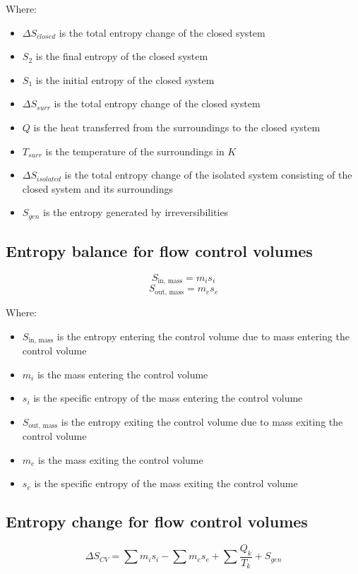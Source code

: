 \documentclass[11pt]{article}
\begin{document}
Where:
\begin{itemize}
\item \(\Delta S_{closed}\) is the total entropy change of the closed system
\item \(S_2\) is the final entropy of the closed system
\item \(S_1\) is the initial entropy of the closed system
\item \(\Delta S_{surr}\) is the total entropy change of the closed system
\item \(Q\) is the heat transferred from the surroundings to the closed system
\item \(T_{surr}\) is the temperature of the surroundings in \(\unit{K}\)
\item \(\Delta S_{isolated}\) is the total entropy change of the isolated system consisting of the closed system and its surroundings
\item \(S_{gen}\) is the entropy generated by irreversibilities
\end{itemize}

 \newpage
\subsection{Entropy balance for flow control volumes}
\label{sec:orgd990416}
\[S_{\text{in, mass}} = m_i s_i\]
\[S_{\text{out, mass}} = m_e s_e\]

Where:
\begin{itemize}
\item \(S_{\text{in, mass}}\) is the entropy entering the control volume due to mass entering the control volume
\item \(m_i\) is the mass entering the control volume
\item \(s_i\) is the specific entropy of the mass entering the control volume
\item \(S_{\text{out, mass}}\) is the entropy exiting the control volume due to mass exiting the control volume
\item \(m_e\) is the mass exiting the control volume
\item \(s_e\) is the specific entropy of the mass exiting the control volume
\end{itemize}
\subsection{Entropy change for flow control volumes}
\label{sec:org192df4a}
\[\Delta S_{CV} = \sum m_i s_i - \sum m_e s_e + \sum \frac{Q_k}{T_k} + S_{gen}\]
\end{document}
